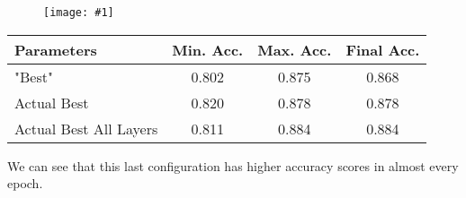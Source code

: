 \documentclass[10pt]{article}
\newcommand{\img}[1]{\begin{figure}[H]\centering\texttt{[image: \#1]}\end{figure}}
\begin{document}
\img{tuning/all_bests.png}
\begin{center}
\begin{tabular}{||l|c|c|c||}
\hline
Parameters             & Min. Acc. & Max. Acc. & Final Acc. \\\hline
\hline
"Best"                 & 0.802     & 0.875     & 0.868      \\
\hline
Actual Best            & 0.820     & 0.878     & 0.878      \\
\hline
Actual Best All Layers & 0.811     & 0.884     & 0.884      \\
\hline
\end{tabular}
\end{center}
We can see that this last configuration has higher accuracy scores in almost every epoch.
\end{document}
